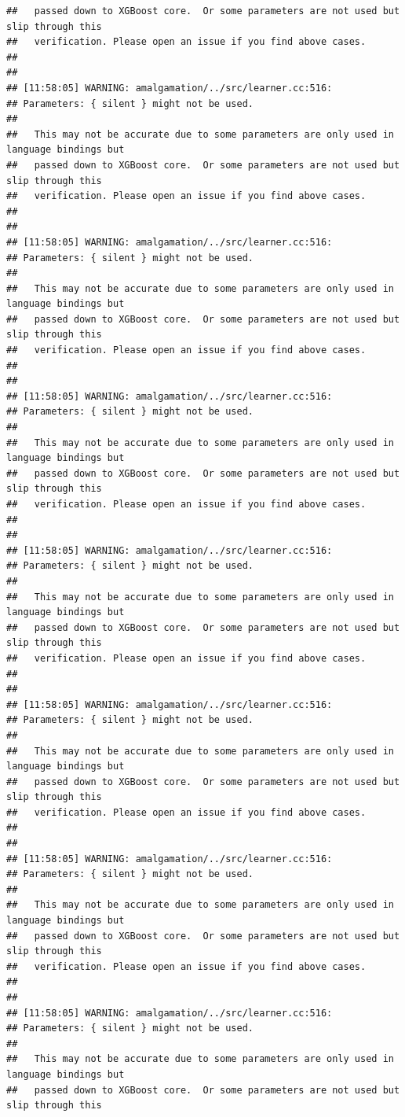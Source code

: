 \documentclass[AMS,STIX2COL]{WileyNJD-v2}\usepackage[]{graphicx}\usepackage[]{color}
\makeatletter
\newenvironment{kframe}{%
 \def\at@end@of@kframe{}%
 \ifinner\ifhmode%
  \def\at@end@of@kframe{\end{minipage}}%
  \begin{minipage}{\columnwidth}%
 \fi\fi%
 \def\FrameCommand##1{\hskip\@totalleftmargin \hskip-\fboxsep
 \colorbox{shadecolor}{##1}\hskip-\fboxsep
     \hskip-\linewidth \hskip-\@totalleftmargin \hskip\columnwidth}%
 \MakeFramed {\advance\hsize-\width
   \@totalleftmargin\z@ \linewidth\hsize
   \@setminipage}}%
 {\par\unskip\endMakeFramed%
 \at@end@of@kframe}
\newenvironment{knitrout}{}{} %
\makeatother
\begin{document}
\begin{knitrout}
\begin{kframe}
\begin{verbatim}
##   passed down to XGBoost core.  Or some parameters are not used but slip through this
##   verification. Please open an issue if you find above cases.
## 
## 
## [11:58:05] WARNING: amalgamation/../src/learner.cc:516: 
## Parameters: { silent } might not be used.
## 
##   This may not be accurate due to some parameters are only used in language bindings but
##   passed down to XGBoost core.  Or some parameters are not used but slip through this
##   verification. Please open an issue if you find above cases.
## 
## 
## [11:58:05] WARNING: amalgamation/../src/learner.cc:516: 
## Parameters: { silent } might not be used.
## 
##   This may not be accurate due to some parameters are only used in language bindings but
##   passed down to XGBoost core.  Or some parameters are not used but slip through this
##   verification. Please open an issue if you find above cases.
## 
## 
## [11:58:05] WARNING: amalgamation/../src/learner.cc:516: 
## Parameters: { silent } might not be used.
## 
##   This may not be accurate due to some parameters are only used in language bindings but
##   passed down to XGBoost core.  Or some parameters are not used but slip through this
##   verification. Please open an issue if you find above cases.
## 
## 
## [11:58:05] WARNING: amalgamation/../src/learner.cc:516: 
## Parameters: { silent } might not be used.
## 
##   This may not be accurate due to some parameters are only used in language bindings but
##   passed down to XGBoost core.  Or some parameters are not used but slip through this
##   verification. Please open an issue if you find above cases.
## 
## 
## [11:58:05] WARNING: amalgamation/../src/learner.cc:516: 
## Parameters: { silent } might not be used.
## 
##   This may not be accurate due to some parameters are only used in language bindings but
##   passed down to XGBoost core.  Or some parameters are not used but slip through this
##   verification. Please open an issue if you find above cases.
## 
## 
## [11:58:05] WARNING: amalgamation/../src/learner.cc:516: 
## Parameters: { silent } might not be used.
## 
##   This may not be accurate due to some parameters are only used in language bindings but
##   passed down to XGBoost core.  Or some parameters are not used but slip through this
##   verification. Please open an issue if you find above cases.
## 
## 
## [11:58:05] WARNING: amalgamation/../src/learner.cc:516: 
## Parameters: { silent } might not be used.
## 
##   This may not be accurate due to some parameters are only used in language bindings but
##   passed down to XGBoost core.  Or some parameters are not used but slip through this

\end{verbatim}
\end{kframe}
\end{knitrout}
\end{document}
